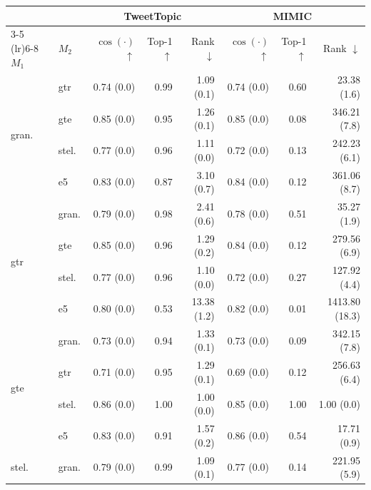 \begin{table}[t]
    \scriptsize
    \centering
    \begin{tabular}{llrrr|rrr}
        \toprule
        \multicolumn{2}{c}{} & \multicolumn{3}{c}{TweetTopic} & \multicolumn{3}{c}{MIMIC}\\
        \cmidrule(lr){3-5} \cmidrule(lr){6-8}
        $M_1$ & $M_2$ & $\cos(\cdot)$ $\uparrow$& Top-1 $\uparrow$& Rank $\downarrow$& $\cos(\cdot)$ $\uparrow$& Top-1 $\uparrow$& Rank $\downarrow$\\
        \midrule
        \multirow{4}{*}{gran.} & gtr & 0.74 {\tiny (0.0)} & 0.99 & 1.09 {\tiny (0.1)} & 0.74 {\tiny (0.0)} & 0.60 & 23.38 {\tiny (1.6)} \\
        & gte & 0.85 {\tiny (0.0)} & 0.95 & 1.26 {\tiny (0.1)} & 0.85 {\tiny (0.0)} & 0.08 & 346.21 {\tiny (7.8)} \\
        & stel. & 0.77 {\tiny (0.0)} & 0.96 & 1.11 {\tiny (0.0)} & 0.72 {\tiny (0.0)} & 0.13 & 242.23 {\tiny (6.1)} \\
        & e5 & 0.83 {\tiny (0.0)} & 0.87 & 3.10 {\tiny (0.7)} & 0.84 {\tiny (0.0)} & 0.12 & 361.06 {\tiny (8.7)} \\
        \midrule
        \multirow{4}{*}{gtr} & gran. & 0.79 {\tiny (0.0)} & 0.98 & 2.41 {\tiny (0.6)} & 0.78 {\tiny (0.0)} & 0.51 & 35.27 {\tiny (1.9)} \\
        & gte & 0.85 {\tiny (0.0)} & 0.96 & 1.29 {\tiny (0.2)} & 0.84 {\tiny (0.0)} & 0.12 & 279.56 {\tiny (6.9)} \\
        & stel. & 0.77 {\tiny (0.0)} & 0.96 & 1.10 {\tiny (0.0)} & 0.72 {\tiny (0.0)} & 0.27 & 127.92 {\tiny (4.4)} \\
        & e5 & 0.80 {\tiny (0.0)} & 0.53 & 13.38 {\tiny (1.2)} & 0.82 {\tiny (0.0)} & 0.01 & 1413.80 {\tiny (18.3)} \\
        \midrule
        \multirow{4}{*}{gte} & gran. & 0.73 {\tiny (0.0)} & 0.94 & 1.33 {\tiny (0.1)} & 0.73 {\tiny (0.0)} & 0.09 & 342.15 {\tiny (7.8)} \\
        & gtr & 0.71 {\tiny (0.0)} & 0.95 & 1.29 {\tiny (0.1)} & 0.69 {\tiny (0.0)} & 0.12 & 256.63 {\tiny (6.4)} \\
        & stel. & 0.86 {\tiny (0.0)} & 1.00 & 1.00 {\tiny (0.0)} & 0.85 {\tiny (0.0)} & 1.00 & 1.00 {\tiny (0.0)} \\
        & e5 & 0.83 {\tiny (0.0)} & 0.91 & 1.57 {\tiny (0.2)} & 0.86 {\tiny (0.0)} & 0.54 & 17.71 {\tiny (0.9)} \\
        \midrule
        \multirow{4}{*}{stel.} & gran. & 0.79 {\tiny (0.0)} & 0.99 & 1.09 {\tiny (0.1)} & 0.77 {\tiny (0.0)} & 0.14 & 221.95 {\tiny (5.9)} \\

\end{tabular}
\end{table}
